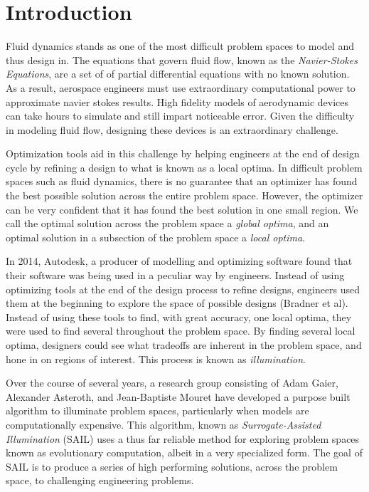 \documentclass{sig-alternate}
\begin{document}

\section{Introduction}
\label{sec:introduction}


Fluid dynamics stands as one of the most difficult problem spaces to model and thus design in.
The equations that govern fluid flow, known as the \textit{Navier-Stokes Equations}, are a set of of partial differential equations with no known solution.
As a result, aerospace engineers must use extraordinary computational power to approximate navier stokes results.
High fidelity models of aerodynamic devices can take hours to simulate and still impart noticeable error.
Given the difficulty in modeling fluid flow, designing these devices is an extraordinary challenge.

Optimization tools aid in this challenge by helping engineers at the end of design cycle by refining a design to what is known as a local optima.
In difficult problem spaces such as fluid dynamics, there is no guarantee that an optimizer has found the best possible solution across the entire problem space.
However, the optimizer can be very confident that it has found the best solution in one small region.
We call the optimal solution across the problem space a \textit{global optima}, and an optimal solution in a subsection of the problem space a \textit{local optima}. 

In 2014, Autodesk, a producer of modelling and optimizing software found that their software was being used in a peculiar way by engineers.
Instead of using optimizing tools at the end of the design process to refine designs, engineers used them at the beginning to explore the space of possible designs (Bradner et al).
Instead of using these tools to find, with great accuracy, one local optima, they were used to find several throughout the problem space.
By finding several local optima, designers could see what tradeoffs are inherent in the problem space, and hone in on regions of interest.
This process is known as \textit{illumination}.

Over the course of several years, a research group consisting of Adam Gaier, Alexander Asteroth, and Jean-Baptiste Mouret have developed a purpose built algorithm to illuminate problem spaces, particularly when models are computationally expensive.
This algorithm, known as \textit{Surrogate-Assisted Illumination} (SAIL) uses a thus far reliable method for exploring problem spaces known as evolutionary computation, albeit in a very specialized form.
The goal of SAIL is to produce a series of high performing solutions, across the problem space, to challenging engineering problems.
\end{document}
